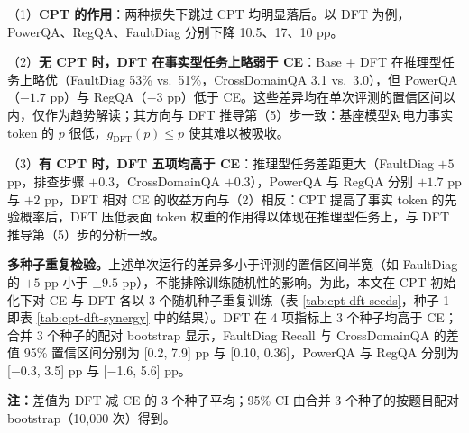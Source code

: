 \documentclass[fontset=fandol,type=master,campus=shenzhen,etitleauto=true]{hithesisbook}
\begin{document}
（1）\textbf{CPT 的作用}：两种损失下跳过 CPT 均明显落后。以 DFT 为例，PowerQA、RegQA、FaultDiag 分别下降 10.5、17、10 pp。

（2）\textbf{无 CPT 时，DFT 在事实型任务上略弱于 CE}：Base + DFT 在推理型任务上略优（FaultDiag 53\% vs.\ 51\%，CrossDomainQA 3.1 vs.\ 3.0），但 PowerQA（$-1.7$ pp）与 RegQA（$-3$ pp）低于 CE。这些差异均在单次评测的置信区间以内，仅作为趋势解读；其方向与 DFT 推导第（5）步一致：基座模型对电力事实 token 的 $p$ 很低，$g_{\text{DFT}}(p) \le p$ 使其难以被吸收。

（3）\textbf{有 CPT 时，DFT 五项均高于 CE}：推理型任务差距更大（FaultDiag $+5$ pp，排查步骤 $+0.3$，CrossDomainQA $+0.3$），PowerQA 与 RegQA 分别 $+1.7$ pp 与 $+2$ pp，DFT 相对 CE 的收益方向与（2）相反：CPT 提高了事实 token 的先验概率后，DFT 压低表面 token 权重的作用得以体现在推理型任务上，与 DFT 推导第（5）步的分析一致。

\textbf{多种子重复检验。}上述单次运行的差异多小于评测的置信区间半宽（如 FaultDiag 的 $+5$ pp 小于 $\pm 9.5$ pp），不能排除训练随机性的影响。为此，本文在 CPT 初始化下对 CE 与 DFT 各以 3 个随机种子重复训练（表 \ref{tab:cpt-dft-seeds}，种子 1 即表 \ref{tab:cpt-dft-synergy} 中的结果）。DFT 在 4 项指标上 3 个种子均高于 CE；合并 3 个种子的配对 bootstrap 显示，FaultDiag Recall 与 CrossDomainQA 的差值 95\% 置信区间分别为 [0.2, 7.9] pp 与 [0.10, 0.36]，PowerQA 与 RegQA 分别为 [$-$0.3, 3.5] pp 与 [$-$1.6, 5.6] pp。

\begin{table}[htbp]
\centering
\caption{CPT 初始化下 CE 与 DFT 的多种子重复结果（3 个随机种子）}
\label{tab:cpt-dft-seeds}
\small
\setlength{\tabcolsep}{4pt}
\renewcommand{\arraystretch}{1.15}

\vspace{0.2cm}
\parbox{\linewidth}{\small \textbf{注：}差值为 DFT 减 CE 的 3 个种子平均；95\% CI 由合并 3 个种子的按题目配对 bootstrap（10{,}000 次）得到。}
\end{table}
\end{document}
